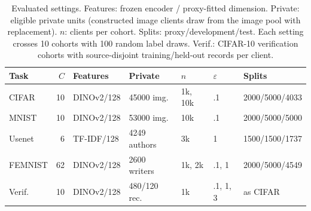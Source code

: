\begin{table}[t]
\caption{Evaluated settings. Features: frozen encoder / proxy-fitted dimension. Private: eligible private units (constructed image clients draw from the image pool with replacement). $n$: clients per cohort. Splits: proxy/development/test. Each setting crosses 10 cohorts with 100 random label draws. Verif.: CIFAR-10 verification cohorts with source-disjoint training/held-out records per client.}
\label{tab:setup}\small\setlength{\tabcolsep}{2pt}
\centering
\begin{tabular}{@{}lrlllll@{}}\toprule
Task & $C$ & Features & Private & $n$ & $\varepsilon$ & Splits \\
\midrule
CIFAR & 10 & DINOv2/128 & 45000 img. & 1k, 10k & .1 & 2000/5000/4033 \\
MNIST & 10 & DINOv2/128 & 53000 img. & 10k & .1 & 2000/5000/5000 \\
Usenet & 6 & TF-IDF/128 & 4249 authors & 3k & 1 & 1500/1500/1737 \\
FEMNIST & 62 & DINOv2/128 & 2600 writers & 1k, 2k & .1, 1 & 2000/5000/4549 \\
Verif. & 10 & DINOv2/128 & 480/120 rec. & 1k & .1, 1, 3 & as CIFAR \\
\bottomrule\end{tabular}
\end{table}
